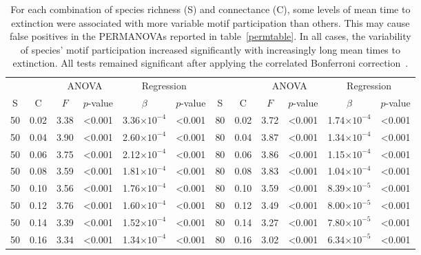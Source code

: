 \documentclass[12pt]{article}
\begin{document}
\begin{spacing}{2.0}
		\begin{table}[h!]
			\caption{For each combination of species richness (S) and connectance (C), some levels of mean time to extinction were associated with more variable motif participation than others. This may cause false positives in the PERMANOVAs reported in table~\ref{permtable}. In all cases, the variability of species' motif participation increased significantly with increasingly long mean times to extinction. All tests remained significant after applying the correlated Bonferroni correction~\citep{Drezner2016}.}
			\label{disptable}
			\footnotesize
			\begin{tabular}{c c | c c| c c ||c c | c c | c c |}
				&		&	\multicolumn{2}{c|}{ANOVA}	&\multicolumn{2}{c||}{Regression} 			& & & 	\multicolumn{2}{c|}{ANOVA}		 	&	 \multicolumn{2}{c|}{Regression} 			\\
	            S	&	C	&	$F$	&	$p$-value	&	$\beta$	&	$p$-value	&	S	&	C	&	$F$	&	$p$-value	&	$\beta$	&	$p$-value	\\
				\hline
	        50	&	0.02	&	3.38	&	\textless0.001	&	3.36$\times10^{-4}$	&	\textless0.001	&	80	&	0.02	&	3.72	&	\textless0.001	&	1.74$\times10^{-4}$	&	\textless0.001	\\
	        50	&	0.04	&	3.90	&	\textless0.001	&	2.60$\times10^{-4}$	&	\textless0.001	&	80	&	0.04	&	3.87	&	\textless0.001	&	1.34$\times10^{-4}$	&	\textless0.001	\\
	        50	&	0.06	&	3.75	&	\textless0.001	&	2.12$\times10^{-4}$	&	\textless0.001	&	80	&	0.06	&	3.86	&	\textless0.001	&	1.15$\times10^{-4}$	&	\textless0.001	\\
	        50	&	0.08	&	3.59	&	\textless0.001	&	1.81$\times10^{-4}$	&	\textless0.001	&	80	&	0.08	&	3.83	&	\textless0.001	&	1.04$\times10^{-4}$	&	\textless0.001	\\
	        50	&	0.10	&	3.56	&	\textless0.001	&	1.76$\times10^{-4}$	&	\textless0.001	&	80	&	0.10	&	3.59	&	\textless0.001	&	8.39$\times10^{-5}$	&	\textless0.001	\\
	        50	&	0.12	&	3.76	&	\textless0.001	&	1.60$\times10^{-4}$	&	\textless0.001	&	80	&	0.12	&	3.49	&	\textless0.001	&	8.00$\times10^{-5}$	&	\textless0.001	\\
	        50	&	0.14	&	3.39	&	\textless0.001	&	1.52$\times10^{-4}$	&	\textless0.001	&	80	&	0.14	&	3.27	&	\textless0.001	&	7.80$\times10^{-5}$	&	\textless0.001	\\
	        50	&	0.16	&	3.34	&	\textless0.001	&	1.34$\times10^{-4}$	&	\textless0.001	&	80	&	0.16	&	3.02	&	\textless0.001	&	6.34$\times10^{-5}$	&	\textless0.001	\\

\end{tabular}
\end{table}
\end{spacing}
\end{document}
